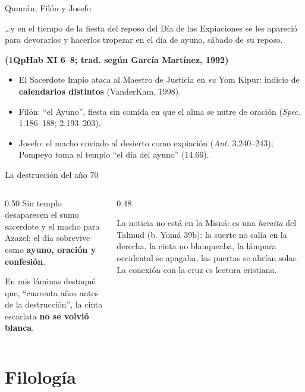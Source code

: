 \documentclass[hyperref={bookmarks=false},aspectratio=169]{beamer}
\newcommand{\fuente}[1]{\par\hfill{\upshape\bfseries\footnotesize\textcolor{tierraroja}{#1}}}
\newcommand{\destacar}[1]{\textbf{\textcolor{tierraroja}{#1}}}
\begin{document}
\begin{frame}{Qumrán, Filón y Josefo}
\begin{cita}\ldots{}y en el tiempo de la fiesta del reposo del Día de las Expiaciones se les apareció para devorarlos y hacerlos tropezar en el día de ayuno, sábado de su reposo.\fuente{(1QpHab XI 6--8; trad. según García Martínez, 1992)}\end{cita}
\scriptsize
\begin{itemize}
\item El Sacerdote Impío ataca al Maestro de Justicia en \emph{su} Yom Kipur: indicio de \destacar{calendarios distintos} (VanderKam, 1998).
\item Filón: ``el Ayuno'', fiesta sin comida en que el alma se nutre de oración (\emph{Spec.} 1.186--188; 2.193--203).
\item Josefo: el macho enviado al desierto como expiación (\emph{Ant.} 3.240--243); Pompeyo toma el templo ``el día del ayuno'' (14.66).
\end{itemize}
\end{frame}

\begin{frame}{La destrucción del año 70}
\begin{columns}[t,onlytextwidth]
\begin{column}{0.50\textwidth}\small
Sin templo desaparecen el sumo sacerdote y el macho para Azazel; el día sobrevive como \destacar{ayuno, oración y confesión}.\par\medskip
En mis láminas destaqué que, ``cuarenta años antes de la destrucción'', la cinta escarlata \destacar{no se volvió blanca}.
\end{column}
\begin{column}{0.48\textwidth}
\begin{tcolorbox}[colback=mostaza!12,colframe=mostaza!80!tierraroja,boxrule=0.6pt,arc=2pt,fontupper=\scriptsize,title={\scriptsize Precisión},coltitle=caferojizo,colbacktitle=mostaza!35]
La noticia no está en la Misná: es una \emph{baraita} del Talmud (b. Yomá 39b): la suerte no salía en la derecha, la cinta no blanqueaba, la lámpara occidental se apagaba, las puertas se abrían solas. La conexión con la cruz es lectura cristiana.
\end{tcolorbox}
\end{column}
\end{columns}
\end{frame}

\section{Filología}
\end{document}
